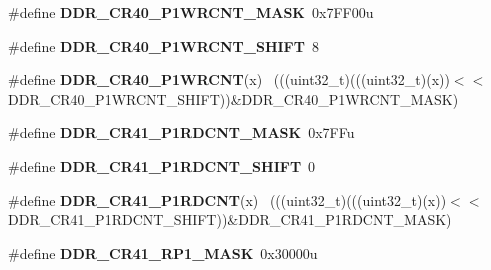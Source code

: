 \begin{DoxyCompactItemize}
\item 
\hypertarget{group___d_d_r___register___masks_gaab7f19a939d889df738146a84e0c64dc}{}\#define {\bfseries D\+D\+R\+\_\+\+C\+R40\+\_\+\+P1\+W\+R\+C\+N\+T\+\_\+\+M\+A\+S\+K}~0x7\+F\+F00u\label{group___d_d_r___register___masks_gaab7f19a939d889df738146a84e0c64dc}

\item 
\hypertarget{group___d_d_r___register___masks_gafabaf61d906307671e8621d0732db10c}{}\#define {\bfseries D\+D\+R\+\_\+\+C\+R40\+\_\+\+P1\+W\+R\+C\+N\+T\+\_\+\+S\+H\+I\+F\+T}~8\label{group___d_d_r___register___masks_gafabaf61d906307671e8621d0732db10c}

\item 
\hypertarget{group___d_d_r___register___masks_gafc1e00e874d471e967f52473dbcc1690}{}\#define {\bfseries D\+D\+R\+\_\+\+C\+R40\+\_\+\+P1\+W\+R\+C\+N\+T}(x)                                        ~(((uint32\+\_\+t)(((uint32\+\_\+t)(x))$<$$<$D\+D\+R\+\_\+\+C\+R40\+\_\+\+P1\+W\+R\+C\+N\+T\+\_\+\+S\+H\+I\+F\+T))\&D\+D\+R\+\_\+\+C\+R40\+\_\+\+P1\+W\+R\+C\+N\+T\+\_\+\+M\+A\+S\+K)\label{group___d_d_r___register___masks_gafc1e00e874d471e967f52473dbcc1690}

\item 
\hypertarget{group___d_d_r___register___masks_ga7e59433001272c8ba955e76659f07e3c}{}\#define {\bfseries D\+D\+R\+\_\+\+C\+R41\+\_\+\+P1\+R\+D\+C\+N\+T\+\_\+\+M\+A\+S\+K}~0x7\+F\+Fu\label{group___d_d_r___register___masks_ga7e59433001272c8ba955e76659f07e3c}

\item 
\hypertarget{group___d_d_r___register___masks_ga94918f2f7022ced979860154a586f9af}{}\#define {\bfseries D\+D\+R\+\_\+\+C\+R41\+\_\+\+P1\+R\+D\+C\+N\+T\+\_\+\+S\+H\+I\+F\+T}~0\label{group___d_d_r___register___masks_ga94918f2f7022ced979860154a586f9af}

\item 
\hypertarget{group___d_d_r___register___masks_ga3ff9e1f14ef56959a4b7be46a8cbb58b}{}\#define {\bfseries D\+D\+R\+\_\+\+C\+R41\+\_\+\+P1\+R\+D\+C\+N\+T}(x)                                        ~(((uint32\+\_\+t)(((uint32\+\_\+t)(x))$<$$<$D\+D\+R\+\_\+\+C\+R41\+\_\+\+P1\+R\+D\+C\+N\+T\+\_\+\+S\+H\+I\+F\+T))\&D\+D\+R\+\_\+\+C\+R41\+\_\+\+P1\+R\+D\+C\+N\+T\+\_\+\+M\+A\+S\+K)\label{group___d_d_r___register___masks_ga3ff9e1f14ef56959a4b7be46a8cbb58b}

\item 
\hypertarget{group___d_d_r___register___masks_ga7eac7e0d5d3d37e884eb468c44b61385}{}\#define {\bfseries D\+D\+R\+\_\+\+C\+R41\+\_\+\+R\+P1\+\_\+\+M\+A\+S\+K}~0x30000u\label{group___d_d_r___register___masks_ga7eac7e0d5d3d37e884eb468c44b61385}


\end{DoxyCompactItemize}
